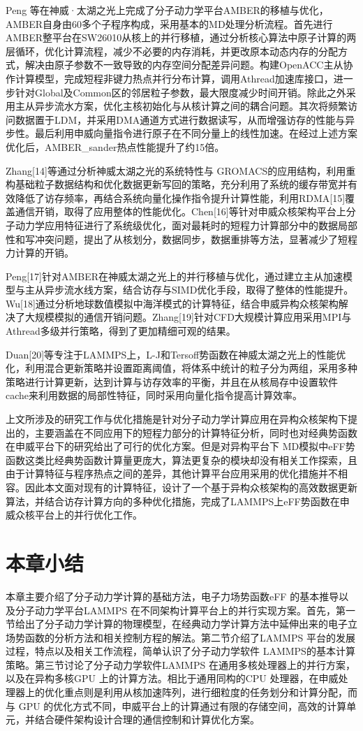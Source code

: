 Peng 等在神威·太湖之光上完成了分子动力学平台AMBER的移植与优化，AMBER自身由60多个子程序构成，采用基本的MD处理分析流程。首先进行AMBER整平台在SW26010从核上的并行移植，通过分析核心算法中原子计算的两层循环，优化计算流程，减少不必要的内存消耗，并更改原本动态内存的分配方式，解决由原子参数不一致导致的内存空间分配差异问题。构建OpenACC主从协作计算模型，完成短程非键力热点并行分布计算，调用Athread加速库接口，进一步针对Global及Common区的邻居粒子参数，最大限度减少时间开销。除此之外采用主从异步流水方案，优化主核初始化与从核计算之间的耦合问题。其次将频繁访问数据置于LDM，并采用DMA通道方式进行数据读写，从而增强访存的性能与异步性。最后利用申威向量指令进行原子在不同分量上的线性加速。在经过上述方案优化后，AMBER\_sander热点性能提升了约15倍。

Zhang[14]等通过分析神威太湖之光的系统特性与 GROMACS的应用结构，利用重构基础粒子数据结构和优化数据更新写回的策略，充分利用了系统的缓存带宽并有效降低了访存频率，再结合系统向量化操作指令提升计算性能，利用RDMA[15]覆盖通信开销，取得了应用整体的性能优化。Chen[16]等针对申威众核架构平台上分子动力学应用特征进行了系统级优化，面对最耗时的短程力计算部分中的数据局部性和写冲突问题，提出了从核划分，数据同步，数据重排等方法，显著减少了短程力计算的开销。

Peng[17]针对AMBER在神威太湖之光上的并行移植与优化，通过建立主从加速模型与主从异步流水线方案，结合访存与SIMD优化手段，取得了整体的性能提升。Wu[18]通过分析地球数值模拟中海洋模式的计算特征，结合申威异构众核架构解决了大规模模拟的通信开销问题。Zhang[19]针对CFD大规模计算应用采用MPI与Athread多级并行策略，得到了更加精细可观的结果。

Duan[20]等专注于LAMMPS上，L-J和Tersoff势函数在神威太湖之光上的性能优化，利用混合更新策略并设置距离阈值，将体系中统计的粒子分为两组，采用多种策略进行计算更新，达到计算与访存效率的平衡，并且在从核局存中设置软件cache来利用数据的局部性特征，同时采用向量化指令提高计算效率。

上文所涉及的研究工作与优化措施是针对分子动力学计算应用在异构众核架构下提出的，主要涵盖在不同应用下的短程力部分的计算特征分析，同时也对经典势函数在申威平台下的研究给出了可行的优化方案。但是对异构平台下 MD模拟中eFF势函数这类比经典势函数计算量更庞大，算法更复杂的模块却没有相关工作探索，且由于计算特征与程序热点之间的差异，其他计算平台应用采用的优化措施并不相容。因此本文面对现有的计算特征，设计了一个基于异构众核架构的高效数据更新算法，并结合访存计算方向的多种优化措施，完成了LAMMPS上eFF势函数在申威众核平台上的并行优化工作。

\section{本章小结}
本章主要介绍了分子动力学计算的基础方法，电子力场势函数eFF 的基本推导以及分子动力学平台LAMMPS 在不同架构计算平台上的并行实现方案。首先，第一节给出了分子动力学计算的物理模型，在经典动力学计算方法中延伸出来的电子立场势函数的分析方法和相关控制方程的解法。第二节介绍了LAMMPS 平台的发展过程，特点以及相关工作流程，简单认识了分子动力学软件 LAMMPS的基本计算策略。第三节讨论了分子动力学软件LAMMPS 在通用多核处理器上的并行方案，以及在异构多核GPU 上的计算方法。相比于通用同构的CPU 处理器，在申威处理器上的优化重点则是利用从核加速阵列，进行细粒度的任务划分和计算分配，而与 GPU 的优化方式不同，申威平台上的计算通过有限的存储空间，高效的计算单元，并结合硬件架构设计合理的通信控制和计算优化方案。

